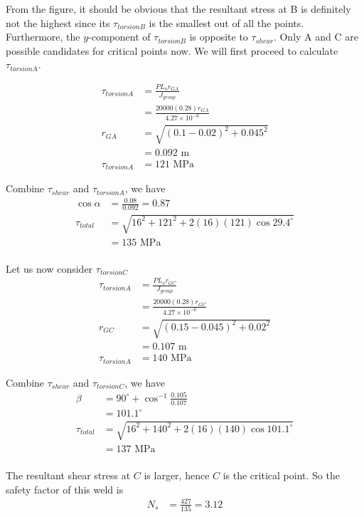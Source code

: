 \documentclass[
10pt,
a4paper,
openany,
svgnames,
]{book}
\begin{document}
\begin{solution}
  From the figure, it should be obvious that the resultant stress at B is definitely not the highest since its $\tau_{torsionB}$ is the smallest out of all the points. Furthermore, the $y$-component of $\tau_{torsionB}$ is opposite to $\tau_{shear}$. Only A and C are possible candidates for critical points now. We will first proceed to calculate $\tau_{torsionA}$.

  \begin{align*}
    \tau_{torsionA} &= \frac{P L_o r_{GA}}{J_{group}} \\
                    &=\frac{20000(0.28) r_{GA}}{4.27 \times 10^{-6}} \\[1em]
    r_{GA} &= \sqrt{(0.1 - 0.02)^2 + 0.045^2} \\
                    &= 0.092 \text{ m} \\[1em]
    \tau_{torsionA} &= 121 \text{ MPa}
  \end{align*}

  Combine $\tau_{shear}$ and $\tau_{torsionA}$, we have
  \begin{align*}
    \cos \alpha &=  \frac{0.08}{0.092} = 0.87 \\
    \tau_{total} &= \sqrt{ 16^2 + 121^2 + 2(16)(121) \cos 29.4^{\circ} } \\
           &= 135 \text{ MPa} \\[1em]
  \end{align*}
  
  Let us now consider $\tau_{torsionC}$
  \begin{align*}
    \tau_{torsionA} &= \frac{P L_o r_{GC}}{J_{group}} \\
                    &=\frac{20000(0.28) r_{GC}}{4.27 \times 10^{-6}} \\[1em]
    r_{GC} &= \sqrt{(0.15 - 0.045)^2 + 0.02^2} \\
                    &= 0.107 \text{ m} \\[1em]
    \tau_{torsionA} &= 140 \text{ MPa}
  \end{align*}

  Combine $\tau_{shear}$ and $\tau_{torsionC}$, we have
  \begin{align*}
    \beta &= 90^{\circ} + \cos^{-1} \frac{0.105}{0.107} \\
          &= 101.1^{\circ} \\[1em]
    \tau_{total} &= \sqrt{ 16^2 + 140^2 + 2(16)(140) \cos 101.1^{\circ} } \\
          &= 137 \text{ MPa} \\[1em]
  \end{align*}

  The resultant shear stress at $C$ is larger, hence $C$ is the critical point. So the safety factor of this weld is
  \begin{align*}  
    N_s &= \frac{427}{135} = 3.12
  \end{align*}
\end{solution}
\end{document}

